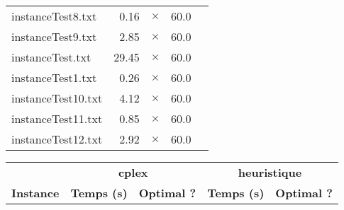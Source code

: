 \documentclass{article}
\begin{document}
\begin{center}
\begin{tabular}{lrrrr}
\\
instanceTest8.txt & 0.16 & 
$\times$
 & 60.0 & 
\\
instanceTest9.txt & 2.85 & 
$\times$
 & 60.0 & 
\\
instanceTest.txt & 29.45 & 
$\times$
 & 60.0 & 
\\
instanceTest1.txt & 0.26 & 
$\times$
 & 60.0 & 
\\
instanceTest10.txt & 4.12 & 
$\times$
 & 60.0 & 
\\
instanceTest11.txt & 0.85 & 
$\times$
 & 60.0 & 
\\
instanceTest12.txt & 2.92 & 
$\times$
 & 60.0 & 
\\
\hline\end{tabular}
\end{center}

\newpage
\begin{center}
\renewcommand{\arraystretch}{1.4} 
 \begin{tabular}{lrrrr}
	\hline
 & \multicolumn{2}{c}{\textbf{cplex}} & \multicolumn{2}{c}{\textbf{heuristique}}\\
\textbf{Instance}  & \textbf{Temps (s)} & \textbf{Optimal ?}  & \textbf{Temps (s)} & \textbf{Optimal ?} \\\hline


\end{tabular}
\end{center}
\end{document}
